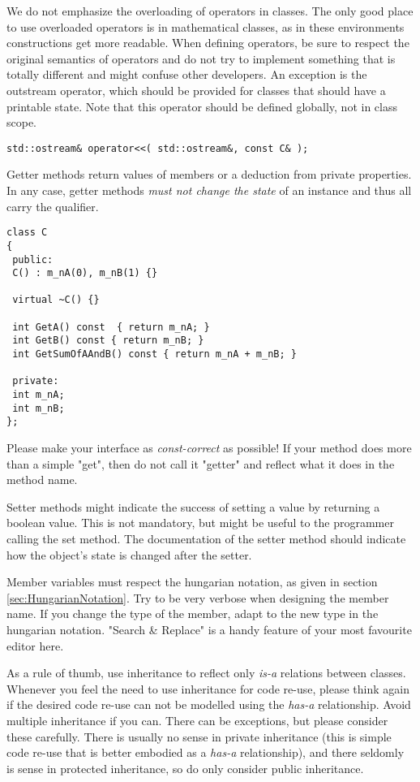 We do not emphasize the overloading of operators in classes.
The only good place to use overloaded operators is in mathematical classes, as in these environments constructions get more readable.
When defining operators, be sure to respect the original semantics of operators and do not try to implement something that is totally different and might confuse other developers.
An exception is the outstream operator, which should be provided for classes that should have a printable state. Note that this operator should be defined globally, not in class scope.
\begin{verbatim}
std::ostream& operator<<( std::ostream&, const C& );
\end{verbatim}


Getter methods return values of members or a deduction from private properties.
In any case, getter methods \emph{must not change the state} of an instance and thus all carry the  qualifier.
\begin{verbatim}
class C
{
 public:
 C() : m_nA(0), m_nB(1) {}
 
 virtual ~C() {}
 
 int GetA() const  { return m_nA; }
 int GetB() const { return m_nB; }
 int GetSumOfAAndB() const { return m_nA + m_nB; }
 
 private:
 int m_nA;
 int m_nB;
}; 
\end{verbatim}
Please make your interface as \emph{const-correct} as possible!
If your method does more than a simple "get", then do not call it "getter" and reflect what it does in the method name.

Setter methods might indicate the success of setting a value by returning a boolean value.
This is not mandatory, but might be useful to the programmer calling the set method.
The documentation of the setter method should indicate how the object's state is changed after the setter.


Member variables must respect the hungarian notation, as given in section \ref{sec:HungarianNotation}.
Try to be very verbose when designing the member name. 
If you change the type of the member, adapt to the new type in the hungarian notation.
"Search \& Replace" is a handy feature of your most favourite editor here.


As a rule of thumb, use inheritance to reflect only \emph{is-a} relations between classes.
Whenever you feel the need to use inheritance for code re-use, please think again if the desired code re-use can not be modelled using the \emph{has-a} relationship.
Avoid multiple inheritance if you can.
There can be exceptions, but please consider these carefully.
There is usually no sense in private inheritance (this is simple code re-use that is better embodied as a \emph{has-a} relationship), and there seldomly is sense in protected inheritance, so do only consider public inheritance.

